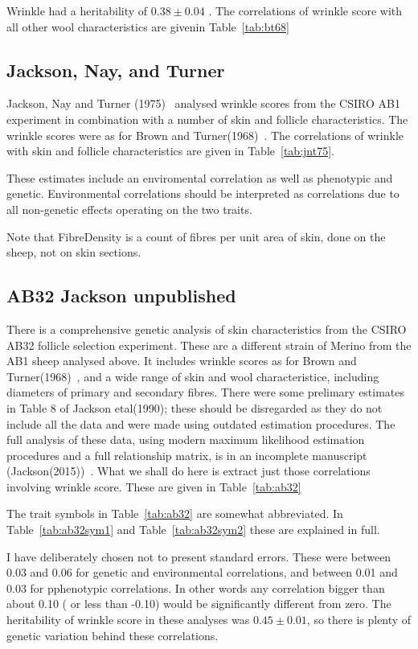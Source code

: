 \documentclass[titlepage]{article}  %
\begin{document}
Wrinkle had a heritability of $0.38 \pm 0.04$ .  The correlations of wrinkle score with all other wool characteristics are givenin Table~\ref{tab:bt68}


\subsection{Jackson, Nay, and Turner}
Jackson, Nay and Turner (1975)~\cite{jack:75} analysed wrinkle scores from the CSIRO AB1 experiment in combination with a number of skin and follicle characteristics. The wrinkle scores were as for Brown and Turner(1968)~\cite{brow:68}. The correlations of wrinkle with skin and follicle characteristics are given in Table~\ref{tab:jnt75}.

These estimates include an enviromental correlation as well as phenotypic and genetic. Environmental correlations should be interpreted as correlations due to all non-genetic effects operating on the two traits.

Note that FibreDensity is a count of fibres per unit area of skin, done on the sheep, not on skin sections. 

\subsection{AB32 Jackson unpublished}
There is a comprehensive genetic analysis of skin characteristics from the CSIRO AB32 follicle selection experiment. These are a different strain of Merino from the AB1 sheep analysed above. It includes wrinkle scores as for Brown and Turner(1968)~\cite{brow:68}, and a wide range of skin and wool characteristice, including diameters of primary and secondary fibres. There were some prelimary estimates in Table 8 of Jackson etal(1990); these should be disregarded as they do not include all the data and were made using outdated estimation procedures. The full analysis of these data, using modern maximum likelihood estimation procedures  and a full relationship matrix, is in an incomplete manuscript (Jackson(2015))~\cite{jack:15}. What we shall do here is extract just those correlations involving wrinkle score. These are given in Table~\ref{tab:ab32}


The trait symbols in Table~\ref{tab:ab32} are somewhat abbreviated. In Table~\ref{tab:ab32sym1} and Table~\ref{tab:ab32sym2} these are explained in full.


I have deliberately chosen not to present standard errors. These were between 0.03 and 0.06 for genetic and environmental correlations, and between 0.01 and 0.03 for pphenotypic correlations. In other words any correlation bigger than about 0.10 ( or less than -0.10) would be significantly different from zero. The heritability of wrinkle score in these analyses was $0.45 \pm 0.01$, so there is plenty of genetic variation behind these correlations.
\end{document}
